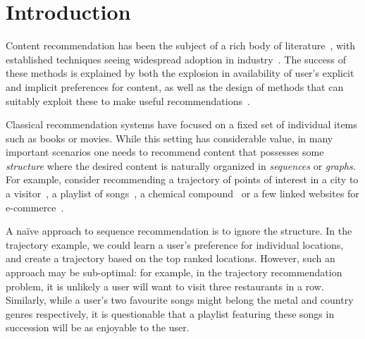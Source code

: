 
\section{Introduction}
\label{sec:intro}

Content recommendation has been the subject of a rich body of literature~\citep{Goldberg:1992,Sarwar:2001,Koren:2010},
with established techniques seeing widespread adoption in industry~\citep{Linden:2003,Agarwal:2013,Amatriain:2015,Gomez-Uribe:2015}.
The success of these methods is explained by both the explosion in availability of user's explicit and implicit preferences for content,
as well as the design of methods that can suitably exploit these to make useful recommendations~\citep{Koren:2009}.

Classical recommendation systems have focused on a fixed set of individual items such as books or movies. %
While this setting has considerable value,
in many important scenarios one needs to recommend content that possesses some \emph{structure}%
where the desired content is naturally organized in
\emph{sequences} or {\em graphs}.
For example, consider %
recommending a trajectory of points of interest in a city to a visitor~\citep{lu2010photo2trip,lu2012personalized,ijcai15,cikm16paper}, a playlist of songs~\citep{McFee:2011,chen2012playlist,hidasi2015session,choi2016towards},
a chemical compound~\cite{dehaspe1998finding} or a few linked websites for e-commerce~\cite{antikacioglu2015recommendation}.
%

A na\"{i}ve approach to sequence recommendation is to ignore the structure.
In the trajectory example, we could learn a user's preference for individual locations,
and create a trajectory based on the top ranked locations.
However, such an approach may be sub-optimal:
for example,
in the trajectory recommendation problem, it is unlikely a user will want to visit three restaurants in a row.
Similarly,
while a user's two favourite songs might belong
the metal and country genres respectively,
it is questionable that a playlist featuring these songs in succession will be as enjoyable to the user.

